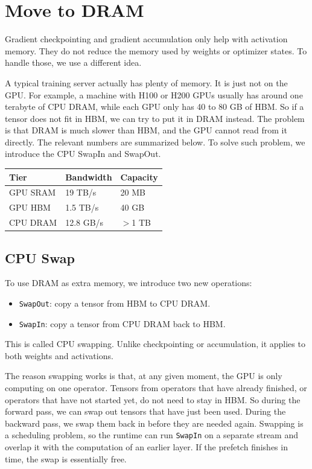 

\section{Move to DRAM}

Gradient checkpointing and gradient accumulation only help with activation memory. They do not reduce the memory used by weights or optimizer states. To handle those, we use a different idea.

A typical training server actually has plenty of memory. It is just not on the GPU. For example, a machine with H100 or H200 GPUs usually has around one terabyte of CPU DRAM, while each GPU only has 40 to 80 GB of HBM. So if a tensor does not fit in HBM, we can try to put it in DRAM instead. The problem is that DRAM is much slower than HBM, and the GPU cannot read from it directly. The relevant numbers are summarized below. To solve such problem, we introduce the CPU SwapIn and SwapOut.

\begin{center}
\begin{tabular}{lll}
\toprule
\textbf{Tier} & \textbf{Bandwidth} & \textbf{Capacity} \\
\midrule
GPU SRAM & 19 TB/s   & 20 MB \\
GPU HBM  & 1.5 TB/s  & 40 GB \\
CPU DRAM & 12.8 GB/s & $>$1 TB \\
\bottomrule
\end{tabular}
\end{center}

\subsection{CPU Swap}

To use DRAM as extra memory, we introduce two new operations:
\begin{itemize}
    \item \texttt{SwapOut}: copy a tensor from HBM to CPU DRAM.
    \item \texttt{SwapIn}: copy a tensor from CPU DRAM back to HBM.
\end{itemize}
This is called CPU swapping. Unlike checkpointing or accumulation, it applies to both weights and activations.

The reason swapping works is that, at any given moment, the GPU is only computing on one operator. Tensors from operators that have already finished, or operators that have not started yet, do not need to stay in HBM. So during the forward pass, we can swap out tensors that have just been used. During the backward pass, we swap them back in before they are needed again. Swapping is a scheduling problem, so the runtime can run \texttt{SwapIn} on a separate stream and overlap it with the computation of an earlier layer. If the prefetch finishes in time, the swap is essentially free.

